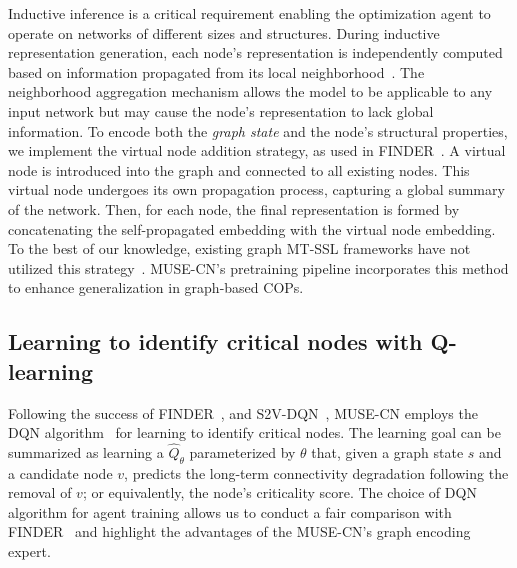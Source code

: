 \documentclass{article}
\begin{document}
Inductive inference is a critical requirement enabling the optimization agent to operate on networks of different sizes and structures. During inductive representation generation, each node's representation is independently computed based on information propagated from its local neighborhood~\cite{hamilton2017inductive}. The neighborhood aggregation  mechanism allows the model to be applicable to any input network but may cause the node's representation to lack global information. To encode both the \textit{graph state} and the node’s structural properties, we implement the virtual node addition strategy, as used in FINDER~\cite{fan2020finding}. A virtual node is introduced into the graph and connected to all existing nodes. This virtual node undergoes its own propagation process, capturing a global summary of the network. Then, for each node, the final representation is formed by concatenating the self-propagated embedding with the virtual node embedding. To the best of our knowledge, existing graph MT-SSL frameworks have not utilized this strategy~\cite{khoshbakhtian2024mega,jin2021automated,ju2022multi}. MUSE-CN’s pretraining pipeline incorporates this method to enhance generalization in graph-based COPs.


\subsection{Learning to identify critical nodes with Q-learning}


Following the success of FINDER~\cite{fan2020finding}, and S2V-DQN~\cite{khalil2017learning}, MUSE-CN employs the DQN algorithm~\cite{mnih2015human} for learning to identify critical nodes. The learning goal can be summarized as learning a $\hat{Q}_\theta$ parameterized by $\theta$ that, given a graph state $s$ and a candidate node $v$, predicts the long-term connectivity degradation following the removal of $v$; or equivalently, the node's criticality score. The choice of DQN algorithm for agent training allows us to conduct a fair comparison with FINDER~\cite{fan2020finding} and highlight the advantages of the MUSE-CN's graph encoding expert.
\end{document}
